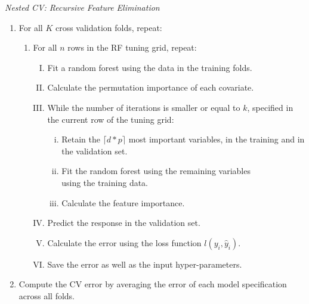 \documentclass[a4paper,12pt, headsepline]{scrartcl}
\numberwithin{equation}{section}
\begin{document}
{\centering
	\begin{minipage}{.9\linewidth}
		\begin{algorithm}[H]
			\caption{\textit{Nested CV: Recursive Feature Elimination}}\label{alg:four}
			\begin{enumerate}
				\item For all $K$ cross validation folds, repeat:
				\begin{enumerate}
					\item For all $n$ rows in the RF tuning grid, repeat:
					\begin{enumerate}[I.]
						\item Fit a random forest using the data in the training folds.
						\item Calculate the permutation importance of each covariate.
						\item While the number of iterations is smaller or equal to $k$, specified in the current row of the tuning grid:
						\begin{enumerate}[i.]
							\item Retain the $\lceil d*p \rceil$ most important variables, in the training and in the validation set.
							\item Fit the random forest using the remaining variables\\ using the training data.
							\item Calculate the feature importance.
						\end{enumerate}
						\item Predict the response in the validation set.
						\item Calculate the error using the loss function $l(y_i, \hat y_i)$.
						\item Save the error as well as the input hyper-parameters. 
					\end{enumerate} 
				\end{enumerate}
				\item Compute the CV error by averaging the error of each model specification across all folds.
			\end{enumerate}
		\end{algorithm}
	\end{minipage}
	\par
}
\end{document}
